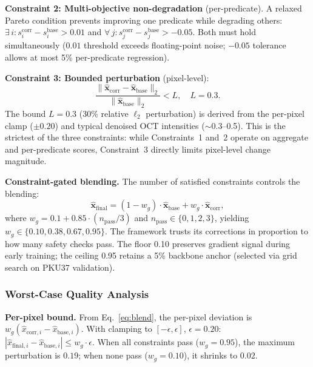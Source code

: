 \documentclass[journal,twoside,web]{ieeecolor}
\begin{document}
\textbf{Constraint 2: Multi-objective non-degradation} (per-predicate). A relaxed Pareto condition prevents improving one predicate while degrading others: $\exists\, i: s_i^\text{corr} - s_i^\text{base} > 0.01$ and $\forall\, j: s_j^\text{corr} - s_j^\text{base} > -0.05$. Both must hold simultaneously ($0.01$ threshold exceeds floating-point noise; $-0.05$ tolerance allows at most 5\% per-predicate regression).

\textbf{Constraint 3: Bounded perturbation} (pixel-level):
\begin{equation}
\frac{\|\hat{\mathbf{x}}_\text{corr} - \hat{\mathbf{x}}_\text{base}\|_2}{\|\hat{\mathbf{x}}_\text{base}\|_2} < L, \quad L = 0.3.
\label{eq:bounded_perturbation}
\end{equation}
The bound $L = 0.3$ (30\% relative $\ell_2$ perturbation) is derived from the per-pixel clamp ($\pm 0.20$) and typical denoised OCT intensities (${\sim}$0.3--0.5). This is the strictest of the three constraints: while Constraints~1 and~2 operate on aggregate and per-predicate scores, Constraint~3 directly limits pixel-level change magnitude.

\textbf{Constraint-gated blending.} The number of satisfied constraints controls the blending:
\begin{equation}
\hat{\mathbf{x}}_\text{final} = (1 - w_g) \cdot \hat{\mathbf{x}}_\text{base} + w_g \cdot \hat{\mathbf{x}}_\text{corr},
\label{eq:blend}
\end{equation}
where $w_g = 0.1 + 0.85 \cdot (n_\text{pass}/3)$ and $n_\text{pass} \in \{0,1,2,3\}$, yielding $w_g \in \{0.10, 0.38, 0.67, 0.95\}$. The framework trusts its corrections in proportion to how many safety checks pass. The floor 0.10 preserves gradient signal during early training; the ceiling 0.95 retains a 5\% backbone anchor (selected via grid search on PKU37 validation).

\subsubsection{Worst-Case Quality Analysis}

\textbf{Per-pixel bound.} From Eq.~\eqref{eq:blend}, the per-pixel deviation is $w_g(\hat{x}_{\mathrm{corr},i} - \hat{x}_{\mathrm{base},i})$. With clamping to $[-\epsilon, \epsilon]$, $\epsilon = 0.20$: $|\hat{x}_{\mathrm{final},i} - \hat{x}_{\mathrm{base},i}| \leq w_g \cdot \epsilon$. When all constraints pass ($w_g = 0.95$), the maximum perturbation is $0.19$; when none pass ($w_g = 0.10$), it shrinks to $0.02$.
\end{document}
